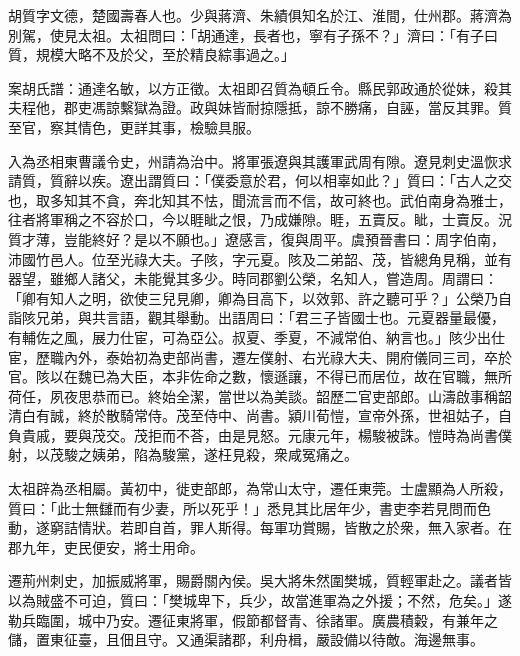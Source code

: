 
\begin{pinyinscope}
胡質字文德，楚國壽春人也。少與蔣濟、朱績俱知名於江、淮間，仕州郡。蔣濟為別駕，使見太祖。太祖問曰：「胡通達，長者也，寧有子孫不？」濟曰：「有子曰質，規模大略不及於父，至於精良綜事過之。」

案胡氏譜：通達名敏，以方正徵。太祖即召質為頓丘令。縣民郭政通於從妹，殺其夫程他，郡吏馮諒繫獄為證。政與妹皆耐掠隱抵，諒不勝痛，自誣，當反其罪。質至官，察其情色，更詳其事，檢驗具服。

入為丞相東曹議令史，州請為治中。將軍張遼與其護軍武周有隙。遼見刺史溫恢求請質，質辭以疾。遼出謂質曰：「僕委意於君，何以相辜如此？」質曰：「古人之交也，取多知其不貪，奔北知其不怯，聞流言而不信，故可終也。武伯南身為雅士，往者將軍稱之不容於口，今以睚眦之恨，乃成嫌隙。睚，五賣反。眦，士賣反。況質才薄，豈能終好？是以不願也。」遼感言，復與周平。虞預晉書曰：周字伯南，沛國竹邑人。位至光祿大夫。子陔，字元夏。陔及二弟韶、茂，皆總角見稱，並有器望，雖鄉人諸父，未能覺其多少。時同郡劉公榮，名知人，嘗造周。周謂曰：「卿有知人之明，欲使三兒見卿，卿為目高下，以效郭、許之聽可乎？」公榮乃自詣陔兄弟，與共言語，觀其舉動。出語周曰：「君三子皆國士也。元夏器量最優，有輔佐之風，展力仕宦，可為亞公。叔夏、季夏，不減常伯、納言也。」陔少出仕宦，歷職內外，泰始初為吏部尚書，遷左僕射、右光祿大夫、開府儀同三司，卒於官。陔以在魏已為大臣，本非佐命之數，懷遜讓，不得已而居位，故在官職，無所荷任，夙夜思恭而已。終始全潔，當世以為美談。韶歷二官吏部郎。山濤啟事稱韶清白有誠，終於散騎常侍。茂至侍中、尚書。潁川荀愷，宣帝外孫，世祖姑子，自負貴戚，要與茂交。茂拒而不荅，由是見怒。元康元年，楊駿被誅。愷時為尚書僕射，以茂駿之姨弟，陷為駿黨，遂枉見殺，衆咸冤痛之。

太祖辟為丞相屬。黃初中，徙吏部郎，為常山太守，遷任東莞。士盧顯為人所殺，質曰：「此士無讎而有少妻，所以死乎！」悉見其比居年少，書吏李若見問而色動，遂窮詰情狀。若即自首，罪人斯得。每軍功賞賜，皆散之於衆，無入家者。在郡九年，吏民便安，將士用命。

遷荊州刺史，加振威將軍，賜爵關內侯。吳大將朱然圍樊城，質輕軍赴之。議者皆以為賊盛不可迫，質曰：「樊城卑下，兵少，故當進軍為之外援；不然，危矣。」遂勒兵臨圍，城中乃安。遷征東將軍，假節都督青、徐諸軍。廣農積糓，有兼年之儲，置東征臺，且佃且守。又通渠諸郡，利舟楫，嚴設備以待敵。海邊無事。


\end{pinyinscope}
